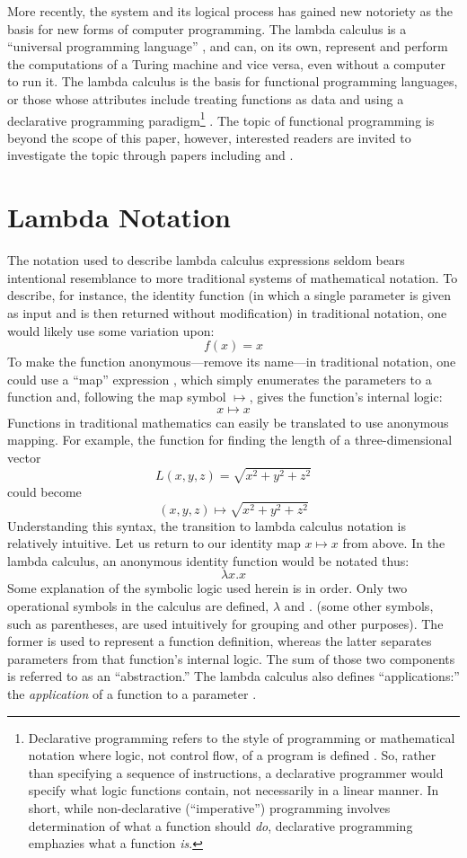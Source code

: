 \documentclass[twocolumn,titlepage,12pt]{article}
\begin{document}
More recently, the system and its logical process has gained new notoriety as the basis for new forms of computer programming. The lambda calculus is a ``universal programming language'' \cite{rojastutorial}, and can, on its own, represent and perform the computations of a Turing machine and vice versa, even without a computer to run it. The lambda calculus is the basis for functional programming languages, or those whose attributes include treating functions as data and using a declarative programming paradigm\footnote{Declarative programming refers to the style of programming or mathematical notation where logic, not control flow, of a program is defined \cite{declarativeprogadv}. So, rather than specifying a sequence of instructions, a declarative programmer would specify what logic functions contain, not necessarily in a linear manner. In short, while non-declarative (``imperative'') programming involves determination of what a function should \textit{do}, declarative programming emphazies what a function \textit{is}.} \cite{hudakevolution}. The topic of functional programming is beyond the scope of this paper, however, interested readers are invited to investigate the topic through papers including \cite{totalfp} and \cite{hudakevolution}.

\section{Lambda Notation}
The notation used to describe lambda calculus expressions seldom bears intentional resemblance to more traditional systems of mathematical notation. To describe, for instance, the identity function (in which a single parameter is given as input and is then returned without modification) in traditional notation, one would likely use some variation upon:
$$f(x)=x$$
To make the function anonymous---remove its name---in traditional notation, one could use a ``map'' expression \cite{intrographtheory}, which simply enumerates the parameters to a function and, following the map symbol $\mapsto$, gives the function's internal logic:
$$x\mapsto x$$
Functions in traditional mathematics can easily be translated to use anonymous mapping. For example, the function for finding the length of a three-dimensional vector
$$L(x,y,z)=\sqrt{x^2+y^2+z^2}$$
could become
$$(x,y,z) \mapsto \sqrt{x^2+y^2+z^2}$$
Understanding this syntax, the transition to lambda calculus notation is relatively intuitive. Let us return to our identity map $x\mapsto x$ from above. In the lambda calculus, an anonymous identity function would be notated thus:
$$\lambda x.x$$
Some explanation of the symbolic logic used herein is in order. Only two operational symbols in the calculus are defined, $\lambda$ and $.$ (some other symbols, such as parentheses, are used intuitively for grouping and other purposes). The former is used to represent a function definition, whereas the latter separates parameters from that function's internal logic. The sum of those two components is referred to as an ``abstraction.'' The lambda calculus also defines ``applications:'' the \textit{application} of a function to a parameter \cite{horowitz}.
\end{document}
